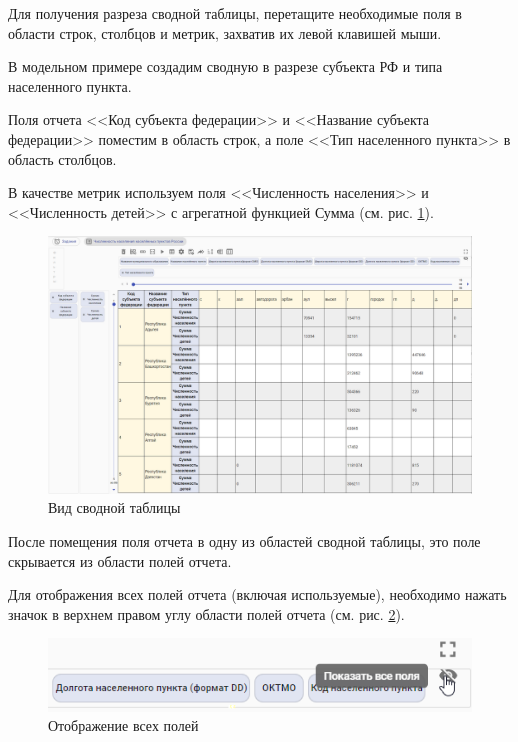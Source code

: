 \documentclass[../user-manual.tex]{subfiles}
\begin{document}
	Для получения разреза сводной таблицы, перетащите необходимые поля в области строк, столбцов и метрик, захватив их левой клавишей мыши.
	
	\begin{modelExample}
		В модельном примере создадим сводную в разрезе субъекта РФ и типа населенного пункта.		
		
		Поля отчета <<Код субъекта федерации>> и <<Название субъекта федерации>> поместим в область строк, а поле <<Тип населенного пункта>> в область столбцов.		
		
		В качестве метрик используем поля <<Численность населения>> и <<Численность детей>> с агрегатной функцией Сумма (см. рис. \ref{fig:pivot-01}).
	\end{modelExample}

	\begin{figure}[h]
		\centering
		\includegraphics[width=\graphicswidth]{img/3-pivot-01.png}
		\caption{Вид сводной таблицы}
		\label{fig:pivot-01}
	\end{figure}	

	После помещения поля отчета в одну из областей сводной таблицы, это поле скрывается из области полей отчета.
	
	Для отображения всех полей отчета (включая используемые), необходимо нажать значок в верхнем правом углу области полей отчета (см. рис. \ref{fig:button-show-all}).
	
	\begin{figure}[h]
		\centering
		\includegraphics[width=\graphicswidth]{img/4-show-all-but.png}
		\caption{Отображение всех полей}
		\label{fig:button-show-all}
	\end{figure}	
\end{document}
